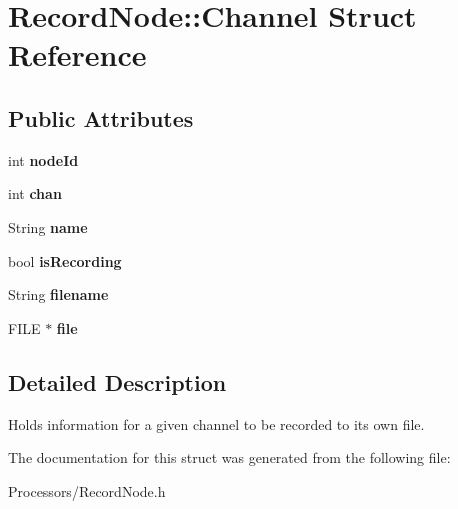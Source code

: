 \hypertarget{structRecordNode_1_1Channel}{\section{Record\-Node\-:\-:Channel Struct Reference}
\label{structRecordNode_1_1Channel}
}
\subsection*{Public Attributes}
\begin{DoxyCompactItemize}
\item 
\hypertarget{structRecordNode_1_1Channel_ac8a38f96771e58f1710969ee1c4e81bc}{int {\bfseries node\-Id}}\label{structRecordNode_1_1Channel_ac8a38f96771e58f1710969ee1c4e81bc}

\item 
\hypertarget{structRecordNode_1_1Channel_af29847633746e201d14acdd316531c24}{int {\bfseries chan}}\label{structRecordNode_1_1Channel_af29847633746e201d14acdd316531c24}

\item 
\hypertarget{structRecordNode_1_1Channel_a7cde8d8153a509a2d1a33c35e2038452}{String {\bfseries name}}\label{structRecordNode_1_1Channel_a7cde8d8153a509a2d1a33c35e2038452}

\item 
\hypertarget{structRecordNode_1_1Channel_a729b53960f427ee5b8fa553af24d89f2}{bool {\bfseries is\-Recording}}\label{structRecordNode_1_1Channel_a729b53960f427ee5b8fa553af24d89f2}

\item 
\hypertarget{structRecordNode_1_1Channel_a17ee4d040024a5fb777479ca3c89cdc7}{String {\bfseries filename}}\label{structRecordNode_1_1Channel_a17ee4d040024a5fb777479ca3c89cdc7}

\item 
\hypertarget{structRecordNode_1_1Channel_ae9bc431717c4a8d8ae2b498c210791f0}{F\-I\-L\-E $\ast$ {\bfseries file}}\label{structRecordNode_1_1Channel_ae9bc431717c4a8d8ae2b498c210791f0}

\end{DoxyCompactItemize}


\subsection{Detailed Description}
Holds information for a given channel to be recorded to its own file. 

The documentation for this struct was generated from the following file\-:\begin{DoxyCompactItemize}
\item 
Processors/Record\-Node.\-h\end{DoxyCompactItemize}
